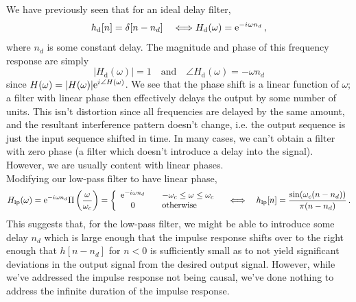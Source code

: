 We have previously seen that for an ideal delay filter,
%
\begin{displaymath}
  h_\mathrm{d}[n] = \delta[n-n_d]
  \quad\Longleftrightarrow
  H_\mathrm{d}(\omega) = \mathrm{e}^{-{i\mkern1mu}\omega n_d} \,,
\end{displaymath}
%
where $n_d$ is some constant delay. The magnitude and phase of this
frequency response are simply
%
\begin{displaymath}
  |H_\mathrm{d}(\omega)| = 1 \quad\mathrm{and}\quad
  \angle H_\mathrm{d}(\omega) = -\omega n_d
\end{displaymath}
%
since $H(\omega) = |H(\omega)|\mathrm{e}^{{i\mkern1mu}\angle H(\omega)}$. We see that
the phase shift is a linear function of $\omega$; a filter with linear
phase then effectively delays the output by some number of units. This
isn't distortion since all frequencies are delayed by the same amount,
and the resultant interference pattern doesn't change, i.e. the output
sequence is just the input sequence shifted in time. In many cases, we
can't obtain a filter with zero phase (a filter which doesn't introduce
a delay into the signal). However, we are usually content with linear
phases.\\
%
Modifying our low-pass filter to have linear phase,
%
\begin{displaymath}
  H_\mathrm{lp}(\omega)
  = \mathrm{e}^{-{i\mkern1mu}\omega n_d}\Pi\left(\frac{\omega}{\omega_c}\right) =
  \left\{\begin{array}{ccl}
  \mathrm{e}^{-{i\mkern1mu}\omega n_d} & & -\omega_c \leq \omega \leq \omega_c \\
  0 & & \mathrm{otherwise}
  \end{array}\right.
  \quad\Longleftrightarrow\quad
  h_\mathrm{lp}[n] = \frac{\sin(\omega_c(n-n_d))}{\pi(n-n_d)} \,.
\end{displaymath}
%
This suggests that, for the low-pass filter, we might be able to introduce
some delay $n_d$ which is large enough that the impulse response shifts
over to the right enough that $h[n-n_d]$ for $n<0$ is sufficiently
small as to not yield significant deviations in the output signal from the
desired output signal. However, while we've addressed the impulse response
not being causal, we've done nothing to address the infinite duration of
the impulse response.

